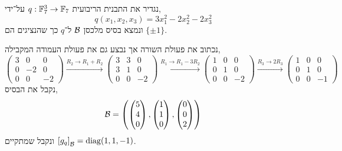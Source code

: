 \question{}
נגדיר את התבנית הריבועית $q : \mathbb{F}_7^3 \to \mathbb{F}_7$ על־ידי,
\[
	q(x_1, x_2, x_3)
	= 3 x_1^2  - 2 x_2^2 - 2 x_3^2
\]
ונמצא בסיס מלכסן $\mathcal{B}$ ל־$q$ כך שהנציגים הם $\{ \pm 1 \}$.
\begin{solution}
	נכתוב את פעולת השורה אך נבצע גם את פעולת העמודה המקבילה,
	\[
		\begin{pmatrix}
			3 & 0 & 0 \\
			0 & -2 & 0 \\
			0 & 0 & -2
		\end{pmatrix}
		\xrightarrow{R_2 \to R_1 + R_2}
		\begin{pmatrix}
			3 & 3 & 0 \\
			3 & 1 & 0 \\
			0 & 0 & -2
		\end{pmatrix}
		\xrightarrow{R_1 \to R_1 - 3 R_2}
		\begin{pmatrix}
			1 & 0 & 0 \\
			0 & 1 & 0 \\
			0 & 0 & -2
		\end{pmatrix}
		\xrightarrow{R_3 \to 2 R_3}
		\begin{pmatrix}
			1 & 0 & 0 \\
			0 & 1 & 0 \\
			0 & 0 & -1
		\end{pmatrix}
	\]
	נקבל את הבסיס,
	\[
		\mathcal{B}
		= \left(
			\begin{pmatrix} 5 \\ 4 \\ 0 \end{pmatrix},
			\begin{pmatrix} 1 \\ 1 \\ 0 \end{pmatrix},
			\begin{pmatrix} 0 \\ 0 \\ 2 \end{pmatrix}
		\right)
	\]
	ונקבל שמתקיים ${[g_q]}_{\mathcal{B}} = \operatorname{diag}(1, 1, -1)$.
\end{solution}


